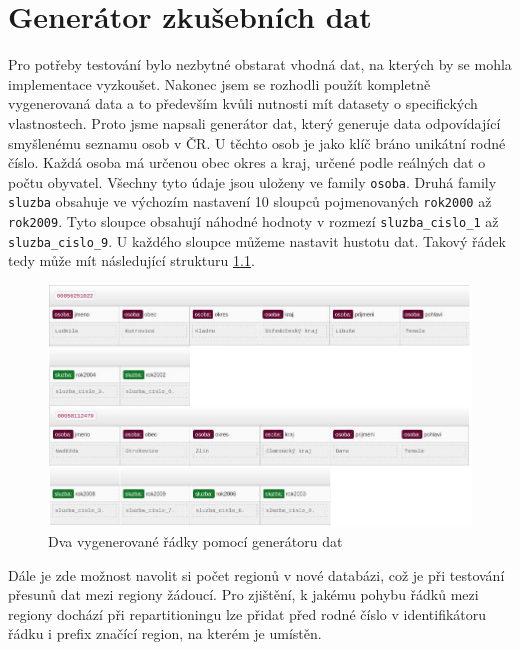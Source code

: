 \documentclass[thesis=M,czech]{FITthesis}[2012/06/26]
\begin{document}



\appendix

\chapter{Generátor zkušebních dat}\label{ch:generator}
Pro potřeby testování bylo nezbytné obstarat vhodná dat, na kterých by se mohla implementace vyzkoušet. Nakonec jsem se rozhodli použít kompletně vygenerovaná data a to především kvůli nutnosti mít datasety o specifických vlastnostech. Proto jsme napsali generátor dat, který generuje data odpovídající smyšlenému seznamu osob v ČR. U těchto osob je jako klíč bráno unikátní rodné číslo. Každá osoba má určenou obec okres a kraj, určené podle reálných dat o počtu obyvatel. Všechny tyto údaje jsou uloženy ve family \texttt{osoba}. Druhá family \texttt{sluzba} obsahuje ve výchozím nastavení 10 sloupců pojmenovaných \texttt{rok2000} až \texttt{rok2009}. Tyto sloupce obsahují náhodné hodnoty v rozmezí \texttt{sluzba\_cislo\_1} až \texttt{sluzba\_cislo\_9}. U každého sloupce můžeme nastavit hustotu dat. Takový řádek tedy může mít následující strukturu \ref{fig:hue}.
\begin{figure}[h]\centering
	\includegraphics[width=1\textwidth, angle=0]{files/hue}
	\caption[Dva vygenerované řádky pomocí generátoru dat]
	{Dva vygenerované řádky pomocí generátoru dat}\label{fig:hue}
\end{figure} 

Dále je zde možnost navolit si počet regionů v nové databázi, což je při testování přesunů dat mezi regiony žádoucí. Pro zjištění, k jakému pohybu řádků mezi regiony dochází při repartitioningu lze přidat před rodné číslo v identifikátoru řádku i prefix značící region, na kterém je umístěn. 
\end{document}
